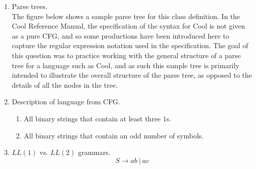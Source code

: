 \documentclass[11pt]{article}
\begin{document}
\begin{enumerate}
	\item Parse trees. \\
		The figure below shows a sample parse tree for this class
		definition.  In the Cool Reference Manual, the specification of the
		syntax for Cool is not given as a pure CFG, and so some productions
		have been introduced here to capture the regular expression notation
		used in the specification.  The goal of this question was to practice
		working with the general structure of a parse tree for a language such
		as Cool, and as such this sample tree is primarily intended to
		illustrate the overall structure of the parse tree, as opposed to the
		details of all the nodes in the tree.
		\begin{center}
			
		\end{center}

	
	\item Description of language from CFG.
		\begin{enumerate}
			\item All binary strings that contain at least three $1$s.
			\item All binary strings that contain an odd number of symbols.
		\end{enumerate}
	
	\item $LL(1)$ vs. $LL(2)$ grammars.
		\[ S \to ab \ | \ ac \]
	

\end{enumerate}
\end{document}
